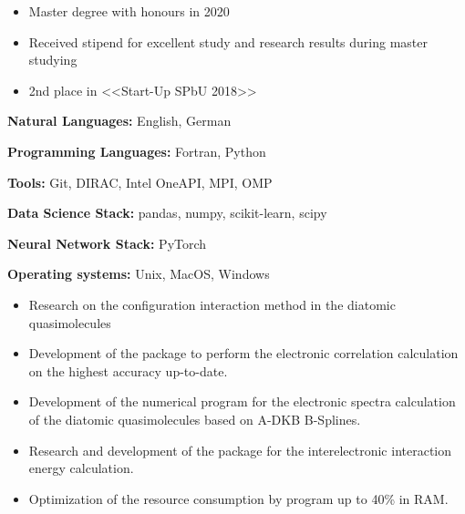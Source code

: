 \begin{itemize}
    \item Master degree with honours in 2020
    \item Received stipend for excellent study and research results during master studying
    \item 2nd place in <<Start-Up SPbU 2018>>
\end{itemize}

\textbf{Natural Languages:} English, German

\textbf{Programming Languages:} Fortran, Python

\textbf{Tools:} Git, DIRAC, Intel OneAPI, MPI, OMP

\textbf{Data Science Stack:} pandas, numpy, scikit-learn, scipy

\textbf{Neural Network Stack:} PyTorch

\textbf{Operating systems:} Unix, MacOS, Windows






\vspace{0.15cm}
\begin{itemize}
    \item Research on the configuration interaction method in the diatomic quasimolecules
    \item Development of the package to perform the electronic correlation calculation on the highest accuracy up-to-date.
\end{itemize}

\begin{itemize}
    \item Development of the numerical program for the electronic spectra calculation of the diatomic quasimolecules based on A-DKB B-Splines.
    \item Research and development of the package for the interelectronic interaction energy calculation.
    \item Optimization of the resource consumption by program up to 40\% in RAM.
\end{itemize}

